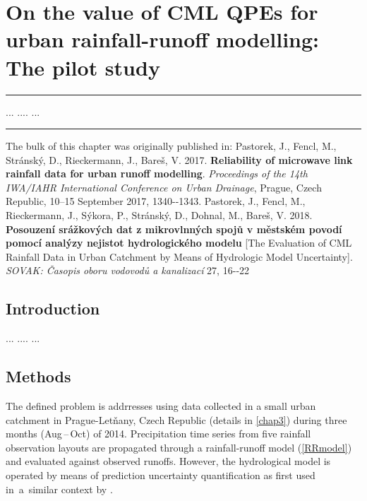 \documentclass{ctuthesis}\usepackage[]{graphicx}\usepackage[]{color}
\begin{document}
        


\chapter{On the value of CML QPEs for urban rainfall-runoff modelling: The pilot study} \label{chap4}

\rule{\textwidth}{0.4pt}
... \newline
....\newline
... \newline
\rule[0.2cm]{\textwidth}{0.4pt}

{\footnotesize The bulk of this chapter was originally published in: \newline
\-\hspace{0.5cm}
Pastorek, J., Fencl, M., Stránský, D., Rieckermann, J., Bareš, V. 2017. \textbf{Reliability of microwave link rainfall data for urban runoff modelling}. \emph{Proceedings of the 14th IWA/IAHR International Conference on Urban Drainage}, Prague, Czech Republic, 10--15 September 2017, 1340-‐1343. \newline
\-\hspace{0.5cm}
Pastorek, J., Fencl, M., Rieckermann, J., Sýkora, P., Stránský, D., Dohnal, M., Bareš, V. 2018. \textbf{Posouzení srážkových dat z mikrovlnných spojů v městském povodí pomocí analýzy nejistot hydrologického modelu} [The Evaluation of CML Rainfall Data in Urban Catchment by Means of Hydrologic Model Uncertainty]. \emph{SOVAK: Časopis oboru vodovodů a kanalizací} 27, 16-‐22
}
\newpage


\section{Introduction}

...
....
...

 
\section{Methods} \label{paperIMnM}

The defined problem is addrresses using data collected in a small urban catchment in Prague-Letňany, Czech Republic (details in \ref{chap3}) during three months (Aug\,--\,Oct) of 2014. Precipitation time series from five rainfall observation layouts are propagated through a rainfall-runoff model (\ref{RRmodel}) and evaluated against observed runoffs. However, the hydrological model is operated by means of prediction uncertainty quantification as first used in~a~similar context by \cite{giudice2013improving}.
\end{document}
